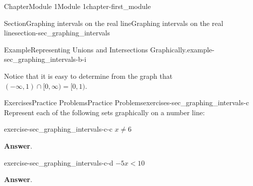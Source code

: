 \documentclass[oneside,10pt,]{book}
\newcommand{\blocktitlefont}{\relax}
\begin{document}
\begin{chapterptx}{Chapter}{Module 1}{}{Module 1}{}{}{chapter-first_module}
\begin{sectionptx}{Section}{Graphing intervals on the real line}{}{Graphing intervals on the real line}{}{}{section-sec_graphing_intervals}
\begin{introduction}{}
\begin{example}{Example}{Representing Unions and Intersections Graphically.}{example-sec_graphing_intervals-b-i}
\begin{image}{0}{1}{0}{}
{\begin{tikzpicture}
\end{tikzpicture}
}%
\end{image}%
Notice that it is easy to determine from the graph that \((-\infty,1)\cap [0,\infty)=[0,1)\).%
\end{example}
\end{introduction}%
%
%
\typeout{************************************************}
\typeout{************************************************}
%
\begin{exercises-subsection-numberless}{Exercises}{Practice Problems}{}{Practice Problems}{}{}{exercises-sec_graphing_intervals-c}
Represent each of the following sets graphically on a number line:%
\begin{divisionexercise}{1}{}{}{exercise-sec_graphing_intervals-c-c}%
\(x\neq 6\)\par\smallskip%
\noindent\textbf{\blocktitlefont Answer}.\hypertarget{answer-sec_graphing_intervals-c-c-b}{}\quad{}\begin{image}{0}{1}{0}{}%
%
\end{image}%
\end{divisionexercise}%
\begin{divisionexercise}{2}{}{}{exercise-sec_graphing_intervals-c-d}%
\(-5x < 10\)\par\smallskip%
\noindent\textbf{\blocktitlefont Answer}.\hypertarget{answer-sec_graphing_intervals-c-d-b}{}\quad{}\begin{image}{0}{1}{0}{}%
%
\end{image}%

\end{divisionexercise}
\end{exercises-subsection-numberless}
\end{sectionptx}
\end{chapterptx}
\end{document}
